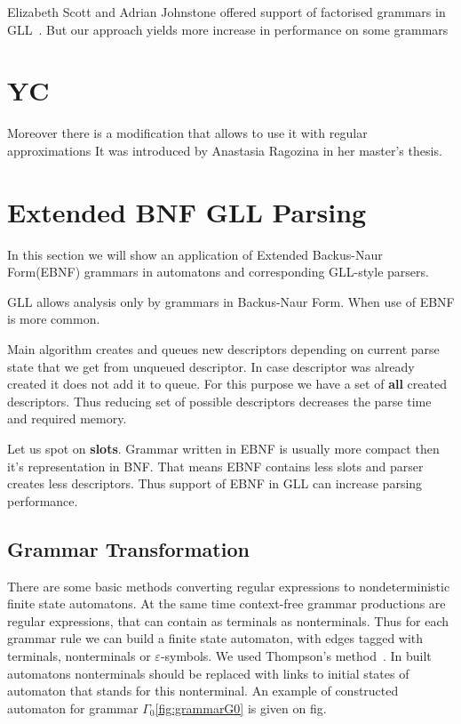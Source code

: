 \documentclass[runningheads,a4paper]{llncs}
\begin{document}
Elizabeth Scott and Adrian Johnstone offered support of factorised grammars in GLL~\cite{scott2016structuring}. 
But our approach yields more increase in performance on some grammars


\section{YC}
Moreover there is a modification that allows to use it with regular approximations It was introduced by 
Anastasia Ragozina in her master's thesis.


\section{Extended BNF GLL Parsing}%

In this section we will show an application of Extended Backus-Naur Form(EBNF) grammars in automatons and corresponding GLL-style parsers.

GLL allows analysis only by grammars in Backus-Naur Form. When use of EBNF is more common.

Main algorithm creates and queues new descriptors depending on current parse state that we get from unqueued descriptor. 
In case descriptor was already created it does not add it to queue. For this purpose we have a set of
\textbf{all} created descriptors. Thus reducing set of possible descriptors decreases the parse time
and required memory.

Let us spot on \textbf{slots}. Grammar written in EBNF is usually more compact then it's representation in BNF. That means EBNF contains 
less slots and parser creates less descriptors. Thus support of EBNF in GLL can increase parsing performance. 

\subsection{Grammar Transformation}%

There are some basic methods converting regular expressions to nondeterministic finite state automatons. 
At the same time context-free grammar productions are regular expressions, that can contain as terminals 
as nonterminals. Thus for each grammar rule we can build a finite state automaton, with edges tagged with 
terminals, nonterminals or $\varepsilon$-symbols. We used Thompson's method~\cite{Thompson:1968:PTR:363347.363387}. 
In built automatons nonterminals should be replaced with links to initial states of automaton that stands 
for this nonterminal. An example of constructed automaton for grammar $\Gamma_{0}$\ref{fig:grammarG0} is given on fig.
\end{document}
